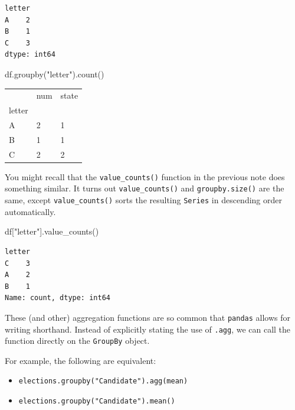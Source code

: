 \documentclass[
  letterpaper,
  DIV=11,
  numbers=noendperiod]{scrreprt}
\newenvironment{Shaded}{\begin{snugshade}}{\end{snugshade}}
\newcommand{\NormalTok}[1]{\textcolor[rgb]{0.00,0.23,0.31}{#1}}
\newcommand{\StringTok}[1]{\textcolor[rgb]{0.13,0.47,0.30}{#1}}
\providecommand{\tightlist}{%
  \setlength{\itemsep}{0pt}\setlength{\parskip}{0pt}}\usepackage{longtable,booktabs,array}
\begin{document}
\begin{verbatim}
letter
A    2
B    1
C    3
dtype: int64
\end{verbatim}

\begin{Shaded}
\begin{Highlighting}[]
\NormalTok{df.groupby(}\StringTok{"letter"}\NormalTok{).count()}
\end{Highlighting}
\end{Shaded}

\begin{longtable}[]{@{}lll@{}}
\toprule\noalign{}
& num & state \\
letter & & \\
\midrule\noalign{}
\endhead
\bottomrule\noalign{}
\endlastfoot
A & 2 & 1 \\
B & 1 & 1 \\
C & 2 & 2 \\
\end{longtable}

You might recall that the \texttt{value\_counts()} function in the
previous note does something similar. It turns out
\texttt{value\_counts()} and \texttt{groupby.size()} are the same,
except \texttt{value\_counts()} sorts the resulting \texttt{Series} in
descending order automatically.

\begin{Shaded}
\begin{Highlighting}[]
\NormalTok{df[}\StringTok{"letter"}\NormalTok{].value\_counts()}
\end{Highlighting}
\end{Shaded}

\begin{verbatim}
letter
C    3
A    2
B    1
Name: count, dtype: int64
\end{verbatim}

These (and other) aggregation functions are so common that
\texttt{pandas} allows for writing shorthand. Instead of explicitly
stating the use of \texttt{.agg}, we can call the function directly on
the \texttt{GroupBy} object.

For example, the following are equivalent:

\begin{itemize}
\tightlist
\item
  \texttt{elections.groupby("Candidate").agg(mean)}
\item
  \texttt{elections.groupby("Candidate").mean()}
\end{itemize}
\end{document}
